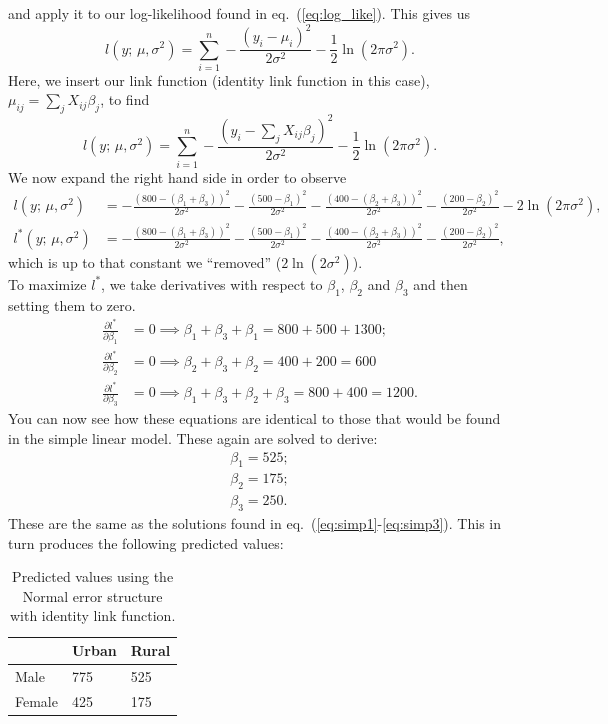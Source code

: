 \documentclass{article}
\begin{document}
and apply it to our log-likelihood found in eq.~(\ref{eq:log_like}). This gives us
\begin{equation}
    l(y;\,\mu,\sigma^2) = \sum_{i=1}^n -\frac{(y_i-\mu_i)^2}{2\sigma^2}-\frac{1}{2}\ln{(2\pi\sigma^2)}.
\end{equation}
Here, we insert our link function (identity link function in this case), $\mu_{ij}=\sum_jX_{ij}\beta_j$, to find
\begin{equation}
    l(y;\,\mu,\sigma^2) = \sum_{i=1}^n -\frac{\left(y_i-\sum_j X_{ij}\beta_j\right)^2}{2\sigma^2}-\frac{1}{2}\ln{(2\pi\sigma^2)}.
\end{equation}
We now expand the right hand side in order to observe
\begin{align}
    l(y;\,\mu,\sigma^2) &= -\frac{(800-(\beta_1+\beta_3))^2}{2\sigma^2} -\frac{(500-\beta_1)^2}{2\sigma^2}-\frac{(400-(\beta_2+\beta_3))^2}{2\sigma^2}-\frac{(200-\beta_2)^2}{2\sigma^2} - 2\ln(2\pi\sigma^2), \\
    l^*(y;\,\mu,\sigma^2) &= -\frac{(800-(\beta_1+\beta_3))^2}{2\sigma^2} -\frac{(500-\beta_1)^2}{2\sigma^2}-\frac{(400-(\beta_2+\beta_3))^2}{2\sigma^2}-\frac{(200-\beta_2)^2}{2\sigma^2}, \label{eq:ex_MSE0}
\end{align}
which is up to that constant we ``removed'' ($2\ln(2\sigma^2)$).\\
To maximize $l^*$, we take derivatives with respect to $\beta_1$, $\beta_2$ and $\beta_3$ and then setting them to zero.
\begin{align}
    \frac{\partial l^*}{\partial \beta_1} &= 0 \implies \beta_1 + \beta_3 + \beta_1 = 800+500+1300; \\
    \frac{\partial l^*}{\partial \beta_2} &= 0 \implies \beta_2 + \beta_3 + \beta_2 = 400 + 200 = 600\\
    \frac{\partial l^*}{\partial \beta_3} &= 0 \implies \beta_1 + \beta_3 + \beta_2 + \beta_3 = 800+400 = 1200.
\end{align}
You can now see how these equations are identical to those that would be found in the simple linear model. These again are solved to derive:
\begin{align}
    \beta_1 = 525; \\
    \beta_2 = 175; \\
    \beta_3 = 250.
\end{align}
These are the same as the solutions found in eq.~(\ref{eq:simp1}-\ref{eq:simp3}). This in turn produces the following predicted values:
\begin{table}[H]
\centering
\begin{tabular}{l|l|l|}
\cline{2-3}
                             & Urban & Rural \\ \hline
\multicolumn{1}{|l|}{Male}   & 775   & 525   \\ \hline
\multicolumn{1}{|l|}{Female} & 425   & 175   \\ \hline
\end{tabular}
    \caption{Predicted values using the Normal error structure with identity link function.}
    \label{fig:covariances_example_1}
\end{table}
\end{document}
